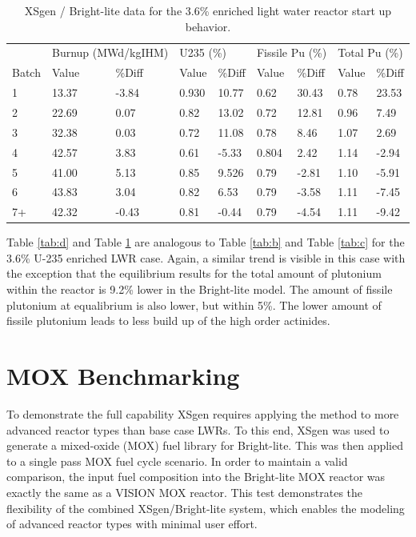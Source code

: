 \documentclass{article}
\begin{document}
\begin{table}[!htb]
\centering
\caption{XSgen / Bright-lite data for the 3.6\% enriched light water reactor start up behavior.}
\label{tab:e}
\begin{tabular}{l ll | ll | ll | ll}
 & \multicolumn{2}{l}{Burnup (MWd/kgIHM)} & \multicolumn{2}{l}{U235 (\%)} & \multicolumn{2}{l}{Fissile Pu (\%)} & \multicolumn{2}{l}{Total Pu (\%)} \\
Batch & Value & \%Diff & Value & \%Diff & Value & \%Diff & Value & \%Diff \\
1 & 13.37 & -3.84 & 0.930 & 10.77 & 0.62 & 30.43 & 0.78 & 23.53 \\
2 & 22.69 & 0.07 & 0.82 & 13.02 & 0.72 & 12.81 & 0.96 & 7.49 \\
3 & 32.38 & 0.03 & 0.72 & 11.08 & 0.78 & 8.46 & 1.07 & 2.69 \\
4 & 42.57 & 3.83 & 0.61 & -5.33 & 0.804 & 2.42 & 1.14 & -2.94 \\
5 & 41.00 & 5.13 & 0.85 & 9.526 & 0.79 & -2.81 & 1.10 & -5.91 \\
6 & 43.83 & 3.04 & 0.82 & 6.53 & 0.79 & -3.58 & 1.11 & -7.45 \\
7+ & 42.32 & -0.43 & 0.81 & -0.44 & 0.79 & -4.54 & 1.11 & -9.42
\end{tabular}
\end{table}

Table \ref{tab:d} and Table \ref{tab:e} are analogous to Table \ref{tab:b} and Table \ref{tab:c}
for the 3.6\% U-235 enriched LWR case. Again, a similar trend is visible in this case with the
exception that the equilibrium results for the total amount of plutonium within the
reactor is 9.2\% lower in the Bright-lite model. The amount of fissile plutonium at equalibrium is also lower,
but within 5\%. The lower amount of fissile plutonium leads
to less build up of the high order actinides.

\section{MOX Benchmarking}
\label{sec-mox-benchmark}
To demonstrate the full capability XSgen requires applying the method to more advanced
reactor types than base case LWRs. To this end, XSgen was used to generate a mixed-oxide (MOX)
fuel library for Bright-lite. This was then applied to a single pass MOX fuel cycle scenario.
In order to maintain a valid comparison, the input fuel composition into the Bright-lite MOX
reactor was exactly the same as a VISION MOX reactor.
This test demonstrates the flexibility of the combined XSgen/Bright-lite system, which enables
the modeling of advanced reactor types with minimal user effort.
\end{document}
